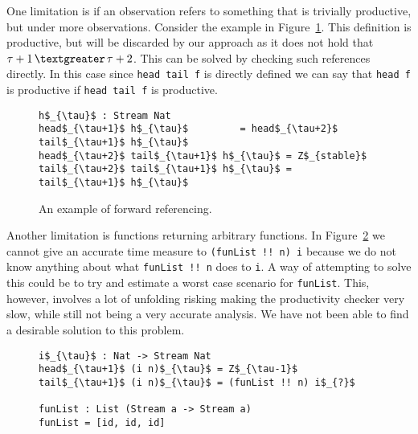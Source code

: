 One limitation is if an observation refers to something that is trivially productive, but under more observations. Consider the example in Figure~\ref{fig:forwardRef}. This definition is productive, but will be discarded by our approach as it does not hold that $\tau+1\,\textgreater\,\tau+2$. This can be solved by checking such references directly. In this case since \texttt{head tail f} is directly defined we can say that \texttt{head f} is productive if \texttt{head tail f} is productive.

\begin{figure}
\begin{Verbatim}[commandchars=\\\{\},codes={\catcode`$=3\catcode`_=8}]
h$_{\tau}$ : Stream Nat
head$_{\tau+1}$ h$_{\tau}$         = head$_{\tau+2}$ tail$_{\tau+1}$ h$_{\tau}$
head$_{\tau+2}$ tail$_{\tau+1}$ h$_{\tau}$ = Z$_{stable}$
tail$_{\tau+2}$ tail$_{\tau+1}$ h$_{\tau}$ = tail$_{\tau+1}$ h$_{\tau}$
\end{Verbatim}
\caption{An example of forward referencing.}
\label{fig:forwardRef}
\end{figure}

Another limitation is functions returning arbitrary functions. In Figure~\ref{fig:funList} we cannot give an accurate time measure to \texttt{(funList !! n) i} because we do not know anything about what \texttt{funList !! n} does to \texttt{i}. A way of attempting to solve this could be to try and estimate a worst case scenario for \texttt{funList}. This, however, involves a lot of unfolding risking making the productivity checker very slow, while still not being a very accurate analysis. We have not been able to find a desirable solution to this problem.

\begin{figure}
\begin{Verbatim}[commandchars=\\\{\},codes={\catcode`$=3\catcode`_=8}]
i$_{\tau}$ : Nat -> Stream Nat
head$_{\tau+1}$ (i n)$_{\tau}$ = Z$_{\tau-1}$
tail$_{\tau+1}$ (i n)$_{\tau}$ = (funList !! n) i$_{?}$

funList : List (Stream a -> Stream a)
funList = [id, id, id]
\end{Verbatim}
\caption{}
\label{fig:funList}
\end{figure}